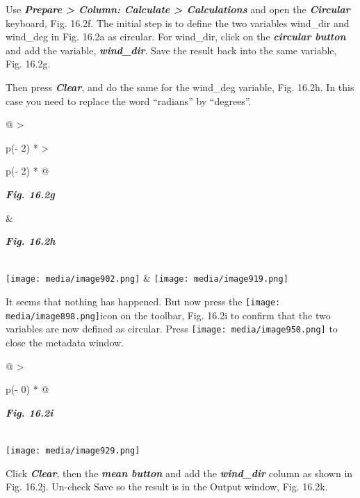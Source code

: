 \documentclass[
  letterpaper,
  DIV=11,
  numbers=noendperiod]{scrreprt}
\begin{document}
Use \textbf{\emph{Prepare \textgreater{} Column: Calculate
\textgreater{} Calculations}} and open the \textbf{\emph{Circular}}
keyboard, Fig. 16.2f. The initial step is to define the two variables
wind\_dir and wind\_deg in Fig. 16.2a as circular. For wind\_dir, click
on the \textbf{\emph{circular button}} and add the variable,
\textbf{\emph{wind\_dir}}. Save the result back into the same variable,
Fig. 16.2g.

Then press \textbf{\emph{Clear}}, and do the same for the wind\_deg
variable, Fig. 16.2h. In this case you need to replace the word
``radians'' by ``degrees''.

\begin{longtable}[]{@{}
  >{\raggedright\arraybackslash}p{(\columnwidth - 2\tabcolsep) * }
  >{\raggedright\arraybackslash}p{(\columnwidth - 2\tabcolsep) * }@{}}
\toprule\noalign{}
\begin{minipage}[b]{\linewidth}\raggedright
\textbf{\emph{Fig. 16.2g}}
\end{minipage} & \begin{minipage}[b]{\linewidth}\raggedright
\textbf{\emph{Fig. 16.2h}}
\end{minipage} \\
\midrule\noalign{}
\endhead
\bottomrule\noalign{}
\endlastfoot
\texttt{[image: media/image902.png]} &
\texttt{[image: media/image919.png]} \\
\end{longtable}

It seems that nothing has happened. But now press the
\texttt{[image: media/image898.png]}icon
on the toolbar, Fig. 16.2i to confirm that the two variables are now
defined as circular. Press
\texttt{[image: media/image950.png]}
to close the metadata window.

\begin{longtable}[]{@{}
  >{\raggedright\arraybackslash}p{(\columnwidth - 0\tabcolsep) * }@{}}
\toprule\noalign{}
\begin{minipage}[b]{\linewidth}\raggedright
\textbf{\emph{Fig. 16.2i}}
\end{minipage} \\
\midrule\noalign{}
\endhead
\bottomrule\noalign{}
\endlastfoot
\texttt{[image: media/image929.png]} \\
\end{longtable}

Click \textbf{\emph{Clear}}, then the \textbf{\emph{mean button}} and
add the \textbf{\emph{wind\_dir}} column as shown in Fig. 16.2j.
Un-check Save so the result is in the Output window, Fig. 16.2k.
\end{document}
